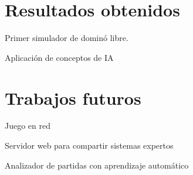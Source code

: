 

\section{Resultados obtenidos}

Primer simulador de dominó libre.

Aplicación de conceptos de IA

\section{Trabajos futuros}

Juego en red

Servidor web para compartir sistemas expertos

Analizador de partidas con aprendizaje automático

